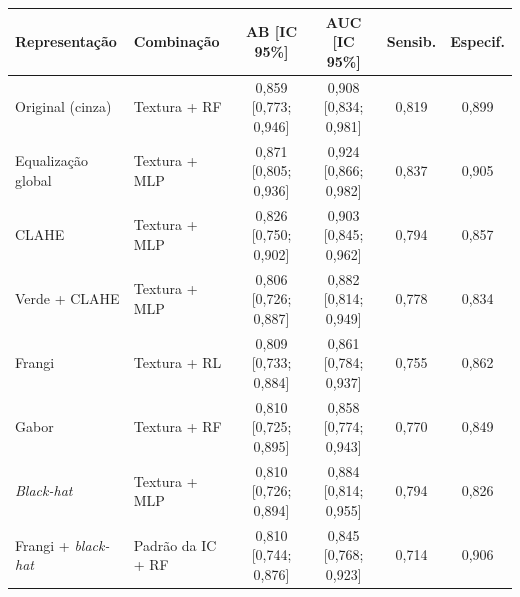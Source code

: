 \begin{tabular}{llcccc}
\toprule
Representação & Combinação & AB [IC 95\%] & AUC [IC 95\%] & Sensib. & Especif. \\
\midrule
Original (cinza) & Textura + RF & 0,859 [0,773; 0,946] & 0,908 [0,834; 0,981] & 0,819 & 0,899 \\
Equalização global & Textura + MLP & 0,871 [0,805; 0,936] & 0,924 [0,866; 0,982] & 0,837 & 0,905 \\
CLAHE & Textura + MLP & 0,826 [0,750; 0,902] & 0,903 [0,845; 0,962] & 0,794 & 0,857 \\
Verde + CLAHE & Textura + MLP & 0,806 [0,726; 0,887] & 0,882 [0,814; 0,949] & 0,778 & 0,834 \\
\midrule
Frangi & Textura + RL & 0,809 [0,733; 0,884] & 0,861 [0,784; 0,937] & 0,755 & 0,862 \\
Gabor & Textura + RF & 0,810 [0,725; 0,895] & 0,858 [0,774; 0,943] & 0,770 & 0,849 \\
\textit{Black-hat} & Textura + MLP & 0,810 [0,726; 0,894] & 0,884 [0,814; 0,955] & 0,794 & 0,826 \\
Frangi + \textit{black-hat} & Padrão da IC + RF & 0,810 [0,744; 0,876] & 0,845 [0,768; 0,923] & 0,714 & 0,906 \\
\bottomrule
\end{tabular}
